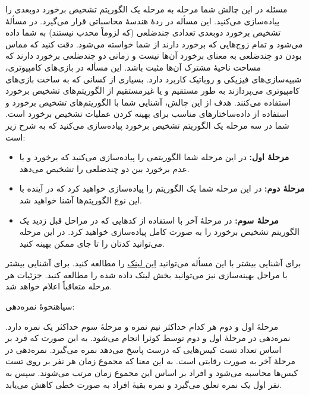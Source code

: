 ‌مسئله 
در این چالش شما مرحله به مرحله یک الگوریتم تشخیص برخورد دوبعدی را پیاده‌سازی می‌کنید. این مسأله در ردۀ هندسۀ محاسباتی قرار می‌گیرد. در مسألۀ تشخیص برخورد دوبعدی تعدادی چندضلعی (که لزوماً محدب نیستند) به شما داده می‌شود و تمام زوج‌هایی که برخورد دارند از شما خواسته می‌شود. دقت کنید که مماس بودن دو چندضلعی به معنای برخورد آن‌ها نیست و زمانی دو چندضلعی برخورد دارند که مساحت ناحیۀ مشترک آن‌ها مثبت باشد. این مسأله در بازی‌های کامپیوتری، شبیه‌سازی‌های فیزیکی و روباتیک کاربرد دارد. بسیاری از کسانی که به ساخت بازی‌های کامپیوتری می‌پردازند به طور مستقیم و یا غیرمستقیم از الگوریتم‌های تشخیص برخورد استفاده می‌کنند. هدف از این چالش، آشنایی شما با الگوریتم‌های تشخیص برخورد و استفاده از داده‌ساختارهای مناسب برای بهینه کردن عملیات تشخیص برخورد است. شما در سه مرحله یک الگوریتم تشخیص برخورد پیاده‌سازی می‌کنید که به شرح زیر است:
\begin{itemize}
	\item \textbf{مرحلۀ اول:}
	در این مرحله شما الگوریتمی را پیاده‌سازی می‌کنید که برخورد و یا عدم برخورد بین دو چندضلعی را تشخیص می‌دهد.
	\item \textbf{مرحلۀ دوم:}
	در این مرحله شما یک الگوریتم  را پیاده‌سازی خواهید کرد که در آینده با این نوع الگوریتم‌ها آشنا خواهید شد.
	\item \textbf{مرحلۀ سوم:}
	در مرحلۀ آخر با استفاده از کدهایی که در مراحل قبل زدید یک الگوریتم تشخیص برخورد را به صورت کامل پیاده‌سازی خواهید کرد. در این مرحله می‌توانید کدتان را تا جای ممکن بهینه کنید.
\end{itemize}
برای آشنایی بیشتر با این مسأله می‌توانید 
\href{https://en.wikipedia.org/wiki/Collision_detection}{این لینک}
را مطالعه کنید. برای آشنایی بیشتر با مراحل بهینه‌سازی نیز می‌توانید بخش  لینک داده شده را مطالعه کنید. جزئیات هر مرحله متعاقباً اعلام خواهد شد.

‌سیاه{نحوۀ نمره‌دهی:}

مرحلۀ اول و دوم هر کدام حداکثر نیم نمره و مرحلۀ سوم حداکثر یک نمره دارد. نمره‌دهی در مرحلۀ اول و دوم توسط کوئرا انجام می‌شود. به این صورت که فرد بر اساس تعداد تست کیس‌هایی که درست پاسخ می‌دهد نمره می‌گیرد. نمره‌دهی در مرحلۀ آخر به صورت رقابتی است. به این معنا که مجموع زمان هر نفر بر روی تست کیس‌ها محاسبه می‌شود و افراد بر اساس این مجموع زمان مرتب می‌شوند. سپس به نفر اول یک نمره تعلق می‌گیرد و نمره بقیۀ افراد به صورت خطی کاهش می‌یابد.


